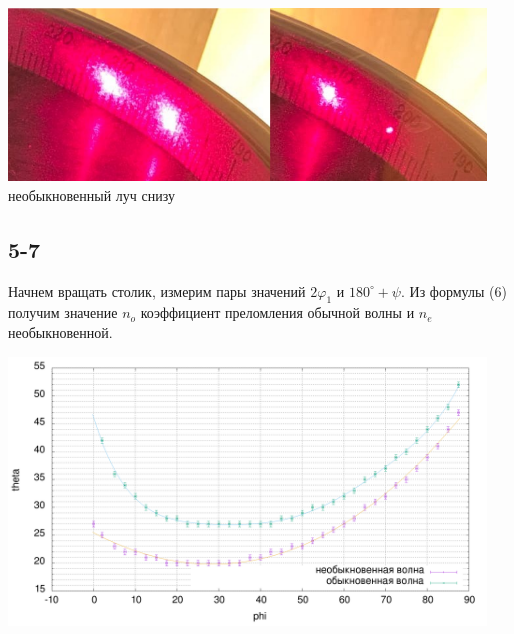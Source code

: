 \begin{center}
\includegraphics[width=0.95\textwidth]{3.png}
необыкновенный луч снизу
\end{center}

\subsection*{5-7}
Начнем вращать столик, измерим пары значений $2\varphi_1$ и $180^\circ+\psi$. Из формулы (6) получим значение $n_o$ коэффициент преломления обычной волны и $n_e$ необыкновенной. 

\begin{center}
\includegraphics[width=0.95\textwidth]{4.png}
\end{center}

